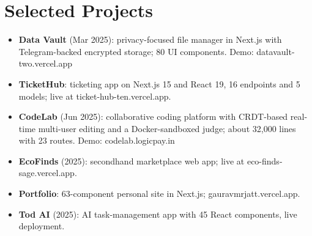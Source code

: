 \documentclass[11pt,a4paper,sans]{moderncv}
\begin{document}
\vspace{1pt}



\section{Selected Projects}
\vspace{1pt}
\begin{itemize}
    \item {\textbf{Data Vault} (Mar 2025): privacy-focused file manager in Next.js with Telegram-backed encrypted storage; 80 UI components. Demo: datavault-two.vercel.app}
    \item {\textbf{TicketHub}: ticketing app on Next.js 15 and React 19, 16 endpoints and 5 models; live at ticket-hub-ten.vercel.app.}
    \item {\textbf{CodeLab} (Jun 2025): collaborative coding platform with CRDT-based real-time multi-user editing and a Docker-sandboxed judge; about 32,000 lines with 23 routes. Demo: codelab.logicpay.in}
    \item {\textbf{EcoFinds} (2025): secondhand marketplace web app; live at eco-finds-sage.vercel.app.}
    \item {\textbf{Portfolio}: 63-component personal site in Next.js; gauravmrjatt.vercel.app.}
    \item {\textbf{Tod AI} (2025): AI task-management app with 45 React components, live deployment.}
\end{itemize}
\end{document}
